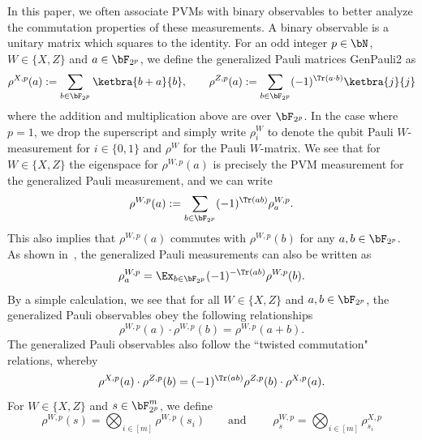 In this paper, we often associate PVMs with binary observables to better analyze the commutation properties of these measurements. A binary observable is a unitary matrix which squares to the identity. For an odd integer $p \in \bN$, $W \in \{X,Z\}$ and $a \in \bF_{2^p}$, we define the generalized Pauli matrices \gls{GenPauli2} as 
\begin{equation*}
	\rho^{X, p}(a) := \sum_{b \in \bF_{2^p}} \ketbra{b + a}{b},  \qquad \rho^{Z, p}(a) := \sum_{b \in \bF_{2^p}} (-1)^{\Tr(a \cdot b)} \ketbra{j}{j}
\end{equation*}
where the addition and multiplication above are over $\bF_{2^p}$. In the case where $p = 1$, we drop the superscript and simply write $\rho^{W}_i$ to denote the qubit Pauli $W$-measurement for $i \in \{0,1\}$ and $\rho^{W}$ for the Pauli $W$-matrix. We see that for $W \in \{X,Z\}$ the eigenspace for $\rho^{W, p}(a)$ is precisely the PVM measurement for the generalized Pauli measurement, and we can write 
\begin{equation}\label{eq:genpaulitoobser}
	\rho^{W, p}(a) := \sum_{b \in \bF_{2^p}} (-1)^{\Tr(ab)} \rho^{W, p}_{a}. 
\end{equation}
This also implies that $\rho^{W, p}(a)$ commutes with $\rho^{W, p}(b)$ for any $a,b \in \bF_{2^p}$. As shown in~\cite[equation 19]{jiMIPRE2022a}, the generalized Pauli measurements can also be written as
\begin{equation}\label{eq:genpaulitomeasure}
	\rho^{W, p}_{a} = \Ex_{b \in \bF_{2^p}} (-1)^{-\Tr(ab)}  	\rho^{W, p}(b).
\end{equation}
By a simple calculation, we see that for all $W \in \{X,Z\}$ and $a,b\in \bF_{2^p}$, the generalized Pauli observables obey the following relationships  
\begin{equation}\label{eq:genpauliaddmult}
	\rho^{W, p}(a) \cdot  \rho^{W, p}(b)  = \rho^{W, p}(a+b).
\end{equation}
The generalized Pauli observables also follow the ``twisted commutation" relations, whereby
\begin{equation}\label{eq:genpaulicomm}
	\rho^{X, p}(a) 	\cdot \rho^{Z, p}(b) = (-1)^{\Tr(ab)} \rho^{Z, p}(b) \cdot \rho^{X, p}(a). 
\end{equation}
For $W \in \{X,Z\}$ and $s \in \bF_{2^p}^m$, we define
\begin{equation} \label{eq:genPaulimeasurement}
	\rho^{W, p}(s) = \bigotimes_{i \in [m]} \rho^{W, p}(s_i) \qquad \text{and } \qquad \rho^{W, p}_{s} = \bigotimes_{i \in [m]} \rho^{X, p}_{s_i}
\end{equation}
